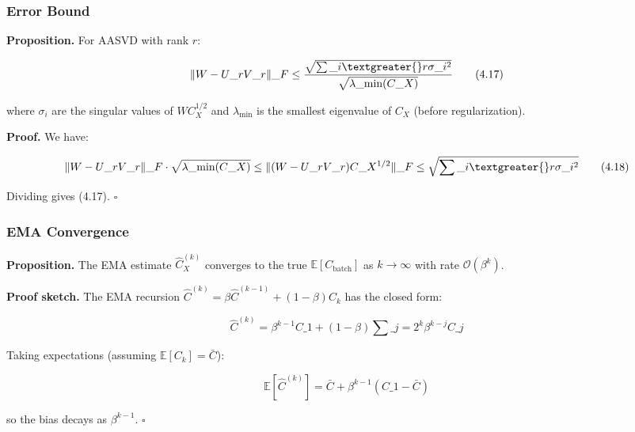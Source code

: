 \subsubsection{Error Bound}

\textbf{Proposition.} For AASVD with rank $r$:

\[
\|W - U\_r V\_r\|\_F \leq \frac{\sqrt{\sum\_{i \textgreater{} r} \sigma\_i^2}}{\sqrt{\lambda\_\text{min}(C\_X)}}
\tag{4.17}
\]

where $\sigma_i$ are the singular values of $W C_X^{1/2}$ and $\lambda_\text{min}$ 
is the smallest eigenvalue of $C_X$ (before regularization).

\textbf{Proof.} We have:

\[
\|W - U\_r V\_r\|\_F \cdot \sqrt{\lambda\_\text{min}(C\_X)}
\leq \|(W - U\_r V\_r) C\_X^{1/2}\|\_F
\leq \sqrt{\sum\_{i \textgreater{} r} \sigma\_i^2}
\tag{4.18}
\]

Dividing gives (4.17). $\square$

\subsubsection{EMA Convergence}

\textbf{Proposition.} The EMA estimate $\hat{C}_X^{(k)}$ converges to the true 
$\mathbb{E}[C_\text{batch}]$ as $k \to \infty$ with rate $\mathcal{O}(\beta^k)$.

\textbf{Proof sketch.} The EMA recursion $\hat{C}^{(k)} = \beta \hat{C}^{(k-1)} + (1-\beta) C_k$ 
has the closed form:

\[
\hat{C}^{(k)} = \beta^{k-1} C\_1 + (1 - \beta) \sum\_{j=2}^{k} \beta^{k-j} C\_j
\tag{4.19}
\]

Taking expectations (assuming $\mathbb{E}[C_k] = \bar{C}$):

\[
\mathbb{E}[\hat{C}^{(k)}] = \bar{C} + \beta^{k-1} (C\_1 - \bar{C})
\tag{4.20}
\]

so the bias decays as $\beta^{k-1}$. $\square$